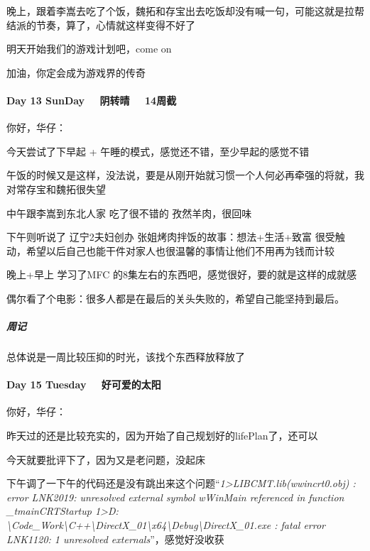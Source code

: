 \documentclass[UTF8,a4paper,8pt]{ctexart}
\begin{document}
        晚上，跟着李嵩去吃了个饭，魏拓和存宝出去吃饭却没有喊一句，可能这就是拉帮结派的节奏，算了，心情就这样变得不好了
        
        明天开始我们的游戏计划吧，come on
        
        加油，你定会成为游戏界的传奇
        
         \paragraph{Day 13 SunDay \ \ 阴转晴 \ \ 14周截}
         
         你好，华仔：
         
         今天尝试了下早起 + 午睡的模式，感觉还不错，至少早起的感觉不错
         
         午饭的时候又是这样，没法说，要是从刚开始就习惯一个人何必再牵强的将就，我对常存宝和魏拓很失望
         
         中午跟李嵩到东北人家 吃了很不错的 孜然羊肉，很回味
         
         下午则听说了 辽宁2夫妇创办 张姐烤肉拌饭的故事：想法+生活+致富 很受触动，希望以后自己也能干件对家人也很温馨的事情让他们不用再为钱而计较
         
         晚上+早上 学习了MFC 的8集左右的东西吧，感觉很好，要的就是这样的成就感
         
         偶尔看了个电影：很多人都是在最后的关头失败的，希望自己能坚持到最后。
         
         \subparagraph{周记}
         
         总体说是一周比较压抑的时光，该找个东西释放释放了
         
        \paragraph{Day 15 Tuesday \ \  好可爱的太阳 }
        你好，华仔：
        
        昨天过的还是比较充实的，因为开始了自己规划好的lifePlan了，还可以
        
        今天就要批评下了，因为又是老问题，没起床
        
        下午调了一下午的代码还是没有跳出来这个问题“\textit{1>LIBCMT.lib(wwincrt0.obj) : error LNK2019: unresolved external symbol wWinMain referenced in function \_tmainCRTStartup
        1>D: \textbackslash Code\_Work\textbackslash C++\textbackslash DirectX\_01\textbackslash x64\textbackslash Debug\textbackslash DirectX\_01.exe : fatal error LNK1120: 1 unresolved externals}”，感觉好没收获
    
\end{document}

